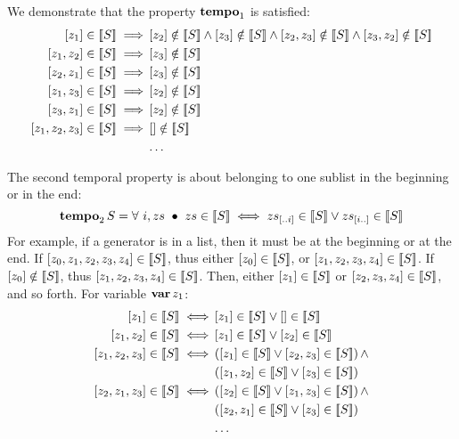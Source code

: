 We demonstrate that the property $\tempo[1]{}$ is satisfied:
\begin{align}
\listsin{z_1} \in \denote{S} \implies & 
\listsin{z_2} \notin \denote{S} \land
\listsin{z_3} \notin \denote{S} \land
\listsin{z_2,z_3}\notin \denote{S} \land
\listsin{z_3,z_2}\notin \denote{S}\nonumber\\
\listsin{z_1,z_2} \in \denote{S} \implies &
\listsin{z_3} \notin \denote{S}\nonumber\\
\listsin{z_2,z_1} \in \denote{S} \implies &
\listsin{z_3} \notin \denote{S}\nonumber\\
\listsin{z_1,z_3} \in \denote{S} \implies &
\listsin{z_2} \notin \denote{S}\nonumber\\
\listsin{z_3,z_1} \in \denote{S} \implies &
\listsin{z_2} \notin \denote{S}\nonumber\\
\listsin{z_1,z_2,z_3} \in \denote{S} \implies &
\listsin{} \notin \denote{S}\nonumber\\
&\ldots\nonumber
\end{align}

The second temporal property is about belonging to one sublist in the beginning or in the end:
%
\begin{equation}
\tempo[2]{S} = \forall~ i, zs ~\bullet~
zs \in \denote{S} \iff
\sliceright{zs}{i} \in \denote{S} \lor \sliceleft{zs}{i} \in \denote{S}\label{def:tempo2}
\end{equation}
%
For example, if a generator is in a list, then it must be at the beginning or at the end.
If $\listsin{z_0,z_1,z_2,z_3,z_4} \in \denote{S}$, thus either $\listsin{z_0}\in\denote{S}$, or $\listsin{z_1,z_2,z_3,z_4} \in \denote{S}$.
If $\listsin{z_0} \notin \denote{S}$, thus $\listsin{z_1,z_2,z_3,z_4} \in \denote{S}$.
Then, either $\listsin{z_1} \in \denote{S}$ or $\listsin{z_2,z_3,z_4} \in \denote{S}$, and so forth.
For variable $\var{z_1}$:
%
\begin{align}
\listsin{z_1} \in \denote{S} \iff &
  \listsin{z_1} \in \denote{S} \lor \listsin{} \in \denote{S}\nonumber\\
\listsin{z_1,z_2} \in \denote{S} \iff &
  \listsin{z_1} \in \denote{S} \lor \listsin{z_2} \in \denote{S}\nonumber\\
\listsin{z_1,z_2,z_3} \in \denote{S} \iff &
  \left(\listsin{z_1} \in \denote{S} \lor \listsin{z_2,z_3} \in \denote{S}\right) \land\nonumber\\
  &\left(\listsin{z_1,z_2} \in \denote{S} \lor \listsin{z_3} \in \denote{S}\right)
  \nonumber\\
\listsin{z_2,z_1,z_3} \in \denote{S} \iff &
  \left(\listsin{z_2} \in \denote{S} \lor \listsin{z_1,z_3} \in \denote{S}\right) \land\nonumber\\
  &\left(\listsin{z_2,z_1} \in \denote{S} \lor \listsin{z_3} \in \denote{S}\right)
  \nonumber\\
& \ldots\nonumber
\end{align}


